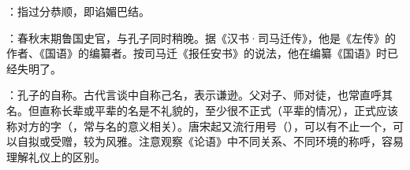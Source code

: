 {
\item {}：指过分恭顺，即谄媚巴结。
\item {}：春秋末期鲁国史官，与孔子同时稍晚。据《汉书·司马迁传》，他是《左传》的作者、《国语》的编纂者。按司马迁《报任安书》的说法，他在编纂《国语》时已经失明了。%

\item {}：孔子的自称。古代言谈中自称己名，表示谦逊。父对子、师对徒，也常直呼其名。但直称长辈或平辈的名是不礼貌的，至少很不正式（平辈的情况），正式应该称对方的字（，常与名的意义相关）。唐宋起又流行用号（），可以有不止一个，可以自拟或受赠，较为风雅。注意观察《论语》中不同关系、不同环境的称呼，容易理解礼仪上的区别。
}
{}


